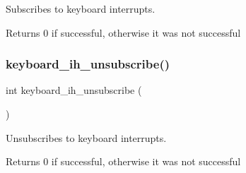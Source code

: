 Subscribes to keyboard interrupts. 

\begin{DoxyReturn}{Returns}
0 if successful, otherwise it was not successful 
\end{DoxyReturn}
\mbox{\label{group__keyboard_gae7dcc7462f98df72164f4a194125d0e9}} 
\subsubsection{\texorpdfstring{keyboard\+\_\+ih\+\_\+unsubscribe()}{keyboard\_ih\_unsubscribe()}}
{\footnotesize\ttfamily int keyboard\+\_\+ih\+\_\+unsubscribe (\begin{DoxyParamCaption}{ }\end{DoxyParamCaption})}



Unsubscribes to keyboard interrupts. 

\begin{DoxyReturn}{Returns}
0 if successful, otherwise it was not successful 
\end{DoxyReturn}
